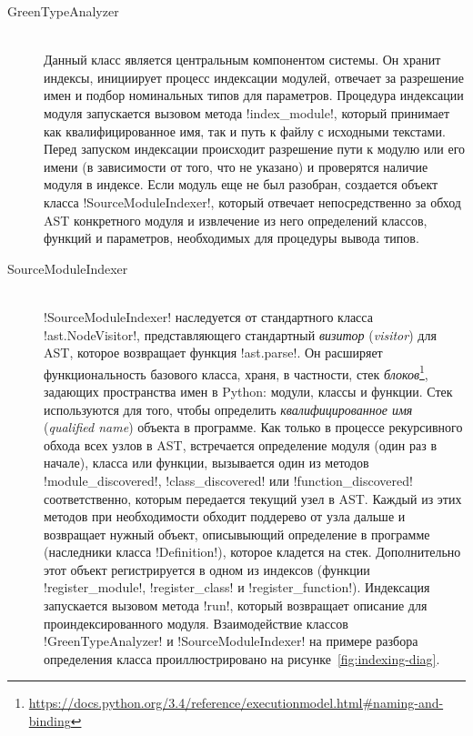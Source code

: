 \begin{description}
  \item[GreenTypeAnalyzer] \hfill \\
    Данный класс является центральным компонентом системы. Он хранит индексы,
    инициирует процесс индексации модулей, отвечает за разрешение имен и подбор
    номинальных типов для параметров. Процедура индексации модуля запускается
    вызовом метода !index_module!, который принимает как квалифицированное имя,
    так и путь к файлу с исходными текстами. Перед запуском индексации
    происходит разрешение пути к модулю или его имени (в зависимости от того, что
    не указано) и проверятся наличие модуля в индексе. Если модуль еще не был
    разобран, создается объект класса !SourceModuleIndexer!, который отвечает
    непосредственно за обход AST конкретного модуля и извлечение из него
    определений классов, функций и параметров, необходимых для процедуры вывода
    типов.

  \item[SourceModuleIndexer] \hfill \\ !SourceModuleIndexer! наследуется от
    стандартного класса !ast.NodeVisitor!, представляющего стандартный
    \emph{визитор} (\emph{visitor}) для AST, которое возвращает функция
    !ast.parse!. Он расширяет функциональность базового класса, храня, в
    частности, стек
    \emph{блоков}\footnote{\url{https://docs.python.org/3.4/reference/executionmodel.html\#naming-and-binding}},
    задающих пространства имен в Python: модули, классы и функции. Стек
    используются для того, чтобы определить \emph{квалифицированное имя}
    (\emph{qualified name}) объекта в программе.  Как только в процессе
    рекурсивного обхода всех узлов в AST, встречается определение модуля (один
    раз в начале), класса или функции, вызывается один из методов
    !module_discovered!, !class_discovered! или !function_discovered!
    соответственно, которым передается текущий узел в AST. Каждый из этих
    методов при необходимости обходит поддерево от узла дальше и возвращает
    нужный объект, описывыющий определение в программе (наследники класса
    !Definition!), которое кладется на стек. Дополнительно этот объект
    регистрируется в одном из индексов
    (функции !register_module!, !register_class! и !register_function!).
    Индексация запускается вызовом метода !run!, который возвращает описание
    для проиндексированного модуля. Взаимодействие классов !GreenTypeAnalyzer! и
    !SourceModuleIndexer! на примере разбора определения класса
    проиллюстрировано на рисунке~\ref{fig:indexing-diag}.


\end{description}
